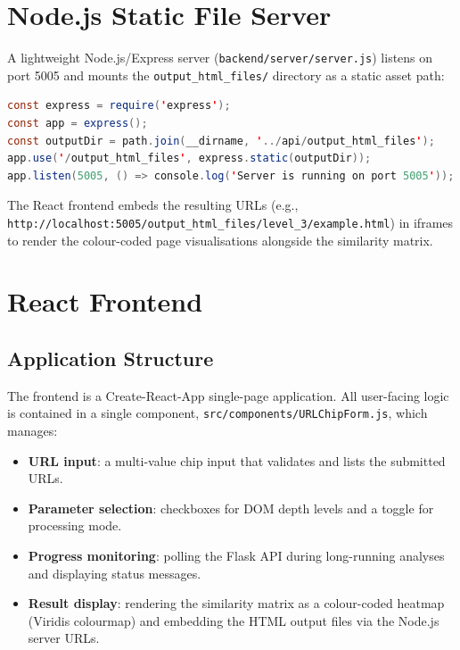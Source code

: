 \section{Node.js Static File Server}
\label{sec:nodejs-server}

A lightweight Node.js/Express server (\texttt{backend/server/server.js}) listens on port 5005 and mounts the \texttt{output\_html\_files/} directory as a static asset path:

\begin{lstlisting}[language=Java, caption=Node.js static server]
const express = require('express');
const app = express();
const outputDir = path.join(__dirname, '../api/output_html_files');
app.use('/output_html_files', express.static(outputDir));
app.listen(5005, () => console.log('Server is running on port 5005'));
\end{lstlisting}

The React frontend embeds the resulting URLs (e.g., \texttt{http://localhost:5005/output\_html\_files/level\_3/example.html}) in iframes to render the colour-coded page visualisations alongside the similarity matrix.

\section{React Frontend}
\label{sec:frontend-implementation}

\subsection{Application Structure}

The frontend is a Create-React-App single-page application. All user-facing logic is contained in a single component, \texttt{src/components/URLChipForm.js}, which manages:

\begin{itemize}
    \item \textbf{URL input}: a multi-value chip input that validates and lists the submitted URLs.
    \item \textbf{Parameter selection}: checkboxes for DOM depth levels and a toggle for processing mode.
    \item \textbf{Progress monitoring}: polling the Flask API during long-running analyses and displaying status messages.
    \item \textbf{Result display}: rendering the similarity matrix as a colour-coded heatmap (Viridis colourmap) and embedding the HTML output files via the Node.js server URLs.
\end{itemize}

